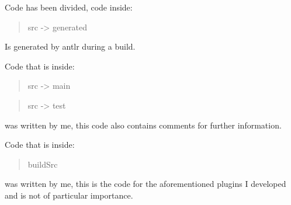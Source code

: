 \documentclass[a4paper,12pt]{article}
\begin{document}
Code has been divided, code inside:
\begin{quotation}
src -> generated
\end{quotation}
Is generated by antlr during a build.


Code that is inside:
\begin{quotation}
src -> main
\end{quotation}
\begin{quotation}
src -> test
\end{quotation}
was written by me, this code also contains comments for further information.

Code that is inside:
\begin{quotation}
buildSrc
\end{quotation}
was written by me, this is the code for the aforementioned plugins I developed and is not of particular importance.
\end{document}
